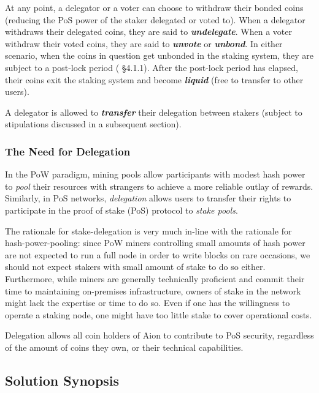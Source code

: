 At any point, a delegator or a voter can choose to withdraw their bonded coins (reducing the PoS power of the staker delegated or voted to). When a delegator withdraws their delegated coins, they are said to \textbf{\textit{undelegate}}. When a voter withdraw their voted coins, they are said to \textbf{\textit{unvote}} or \textbf{\textit{unbond}}. In either scenario, when the coins in question get unbonded in the staking system, they are subject to a post-lock period (\cite{WZS19} \S4.1.1). After the post-lock period has elapsed, their coins exit the staking system and become \textbf{\textit{liquid}} (free to transfer to other users). 

A delegator is allowed to \textbf{\textit{transfer}} their delegation between stakers (subject to stipulations discussed in a subsequent section). 

\subsubsection{The Need for Delegation} \label{delegation_overview}
In the PoW paradigm, mining pools allow participants with modest hash power to \textit{pool} their resources with strangers to achieve a more reliable outlay of rewards. Similarly, in PoS networks, \textit{delegation} allows users to transfer their rights to participate in the proof of stake (PoS) protocol to \textit{stake pools}. 

The rationale for stake-delegation is very much in-line with the rationale for hash-power-pooling: since PoW miners controlling small amounts of hash power are not expected to run a full node in order to write blocks on rare occasions, we should not expect stakers with small amount of stake to do so either. Furthermore, while miners are generally technically proficient and commit their time to maintaining on-premises infrastructure, owners of stake in the network might lack the expertise or time to do so. Even if one has the willingness to operate a staking node, one might have too little stake to cover operational costs. 

Delegation allows all coin holders of Aion to contribute to PoS security, regardless of the amount of coins they own, or their technical capabilities.

\subsection{Solution Synopsis}


